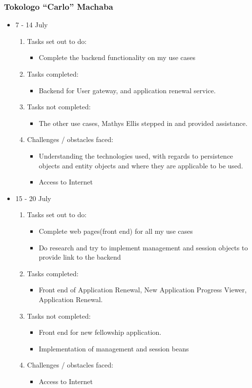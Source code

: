 \subsubsection{Tokologo “Carlo” Machaba}
\begin{itemize}
	\item 7 - 14 July
	\begin{enumerate}
	\item Tasks set out to do:
	\begin{itemize}
		\item Complete the backend functionality on my use cases
	\end{itemize}
	\item Tasks completed:
	\begin{itemize}
		\item Backend for User gateway, and application renewal service.
	\end{itemize}
	\item Tasks not completed:
	\begin{itemize}
		\item The other use cases, Mathys Ellis stepped in and provided assistance.
	\end{itemize}	
	\item Challenges / obstacles faced:
	\begin{itemize}
		\item Understanding the technologies used, with regards to persistence objects and entity objects and where they are applicable to be used.
		\item Access to Internet
	\end{itemize}
	\end{enumerate}
	\item 15 - 20 July
	\begin{enumerate}
	\item Tasks set out to do:
	\begin{itemize}
		\item Complete web pages(front end) for all my use cases
		\item Do research and try to implement management and session objects to provide link to the backend
	\end{itemize}
	\item Tasks completed:
	\begin{itemize}
		\item Front end of Application Renewal, New Application Progress Viewer, Application Renewal.
	\end{itemize}
	\item Tasks not completed:
	\begin{itemize}
		\item Front end for new fellowship application.
		\item Implementation of management and session beans
	\end{itemize}	
	\item Challenges / obstacles faced:
	\begin{itemize}
		\item Access to Internet
	\end{itemize}
	\end{enumerate}	 
\end{itemize}

